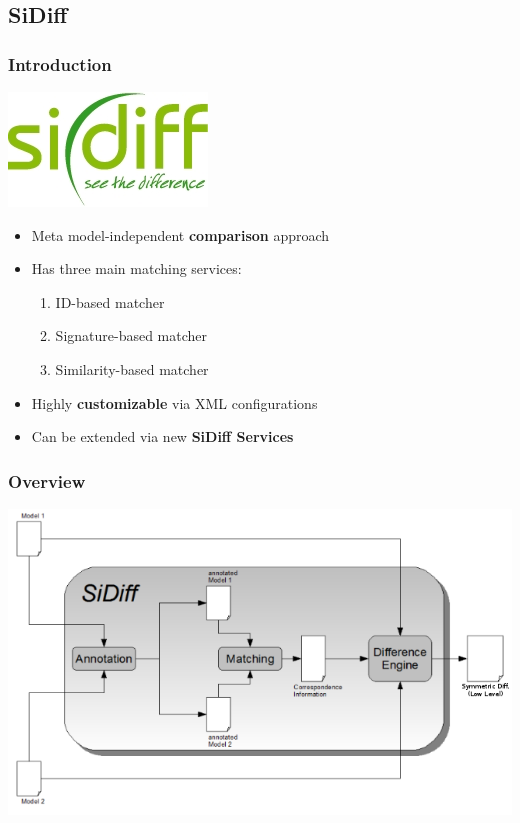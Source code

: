 \documentclass[10pt]{beamer}
\begin{document}
\subsection{SiDiff}
\begin{frame}
\frametitle{Introduction}
\begin{center}
\includegraphics[scale=0.4]{sidiffLogo}\\
\end{center}
\begin{itemize}
  \item Meta model-independent \textbf{comparison} approach
  \item Has three main matching services:
  \begin{enumerate}
    \item ID-based matcher
    \item Signature-based matcher
    \item Similarity-based matcher
  \end{enumerate}
  \item Highly \textbf{customizable} via XML configurations
  \item Can be extended via new \textbf{SiDiff Services}
\end{itemize}
\end{frame}
\begin{frame}
\frametitle{Overview}
\begin{center}
\includegraphics[scale=0.4]{sidiffworkflow}\\
\end{center}
\end{frame}
\end{document}
